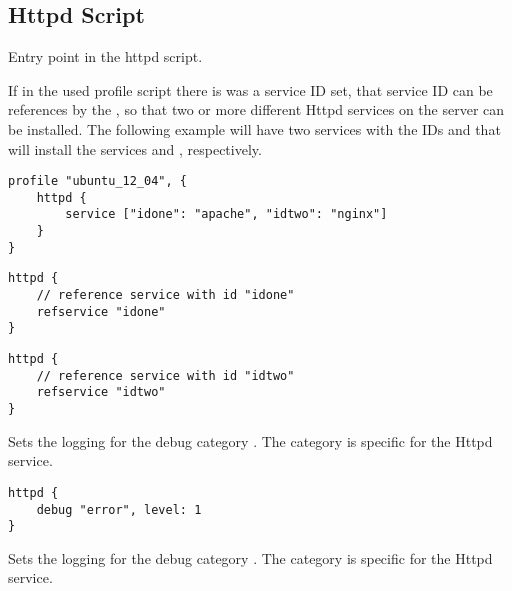 \subsection{Httpd Script}



Entry point in the httpd script.


If in the used profile script there is was a service ID set,
that service ID can be references by the , so that 
two or more different Httpd services on the server can be installed.
The following example will have two services with the IDs 
and  that will install the services  and
, respectively.

\begin{lstlisting}[style=Java,caption={Profile with the services IDs "UbuntuProfile.groovy".}]
profile "ubuntu_12_04", {
    httpd {
        service ["idone": "apache", "idtwo": "nginx"]
    }
}
\end{lstlisting}

\begin{lstlisting}[style=Java,caption={Script "HttpdOne.groovy"}]
httpd {
    // reference service with id "idone"
    refservice "idone"
}
\end{lstlisting}

\begin{lstlisting}[style=Java,caption={Script "HttpdTwo.groovy"}]
httpd {
    // reference service with id "idtwo"
    refservice "idtwo"
}
\end{lstlisting}


Sets the logging  for the debug category . The category
is specific for the Httpd service.

\begin{lstlisting}[style=Java]
httpd {
    debug "error", level: 1
}
\end{lstlisting}


Sets the logging  for the debug category . The category
is specific for the Httpd service.

